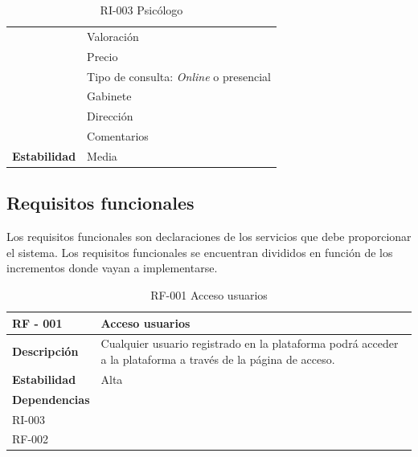 \begin{table}[htpb]
\begin{tabularx}{\textwidth}{|l|X|}
                   & Valoración                                                                   \\ 
                   & Precio                                                                       \\ 
                   & Tipo de consulta: \textit{Online} o presencial                                        \\
                   & Gabinete                                                                     \\
                   & Dirección 
\\
				   & Comentarios
\\ \hline
\textbf{Estabilidad}        & Media                                                                        \\ \hline
\end{tabularx}
\caption{RI-003 Psicólogo}
\end{table}


\subsection{Requisitos funcionales}


Los requisitos funcionales son declaraciones de los servicios que debe proporcionar el sistema. Los requisitos funcionales se encuentran divididos en función de los incrementos donde vayan a implementarse\cite{sommerville}.




\begin{table}[htpb]
\centering
\begin{tabularx}{\textwidth}{|l|X|}
\hline
\rowcolor[gray]{0.9}\textbf{RF - 001 }                               & \textbf{Acceso usuarios                                                                                             } \\ \hline
\textbf{Descripción}                             & Cualquier usuario registrado en la plataforma podrá acceder a la plataforma a través de la página de acceso. \\ \hline
\textbf{Estabilidad}                             & Alta                                                                                                         \\ \hline
\textbf{Dependencias} & \begin{tabular}[c]{@{}l@{}}RI-001 \\ RI-003 \\ RF-002\end{tabular}                                           \\ \hline
\end{tabularx}
\caption{RF-001 Acceso usuarios}
\end{table}


